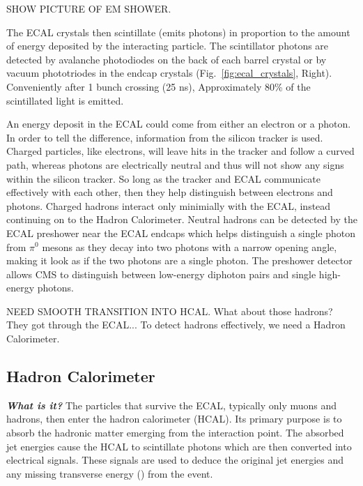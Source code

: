 SHOW PICTURE OF EM SHOWER.

The ECAL crystals then scintillate (emits photons) in proportion to the amount of energy deposited by the interacting particle. 
The scintillator photons are detected by avalanche photodiodes on the back of each barrel crystal or by vacuum phototriodes in the endcap crystals (Fig.~\ref{fig:ecal_crystals}, Right).
Conveniently after 1 bunch crossing (25 ns), Approximately 80\% of the scintillated light is emitted.

An energy deposit in the ECAL could come from either an electron or a photon.
In order to tell the difference, information from the silicon tracker is used.
Charged particles, like electrons, will leave hits in the tracker and follow a curved path, whereas photons are electrically neutral and thus will not show any signs within the silicon tracker.
So long as the tracker and ECAL communicate effectively with each other, then they help distinguish between electrons and photons.
Charged hadrons interact only minimially with the ECAL, instead continuing on to the Hadron Calorimeter.
Neutral hadrons can be detected by the ECAL preshower near the ECAL endcaps which helps distinguish a single photon from $\pi^{0}$ mesons as they decay into two photons with a narrow opening angle, making it look as if the two photons are a single photon.
The preshower detector allows CMS to distinguish between low-energy diphoton pairs and single high-energy photons.

NEED SMOOTH TRANSITION INTO HCAL. What about those hadrons? They got through the ECAL... To detect hadrons effectively, we need a Hadron Calorimeter.

\subsection{Hadron Calorimeter}

\textit{\textbf{What is it?}}
The particles that survive the ECAL, typically only muons and hadrons, then enter the hadron calorimeter (HCAL).
Its primary purpose is to absorb the hadronic matter emerging from the interaction point.
The absorbed jet energies cause the HCAL to scintillate photons which are then converted into electrical signals.
These signals are used to deduce the original jet energies and any missing transverse energy (\MET) from the event.

